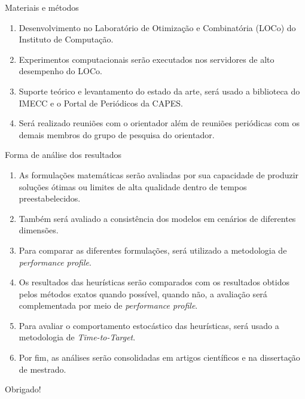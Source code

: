 \documentclass{beamer}
\begin{document}
\begin{frame}{Materiais e métodos}
    
    \begin{enumerate}
        \item Desenvolvimento no Laboratório de Otimização e Combinatória (LOCo) do Instituto de Computação.
        \pause
        \item Experimentos computacionais serão executados nos servidores de alto desempenho do LOCo.
        \pause
        \item Suporte teórico e levantamento do estado da arte, será usado a biblioteca do IMECC e o Portal de Periódicos da CAPES.
        \pause
        \item Será realizado reuniões com o orientador além de reuniões periódicas com os demais membros do grupo de pesquisa do orientador.
    \end{enumerate}

\end{frame}

\begin{frame}{Forma de análise dos resultados}
    
    \begin{enumerate}
        \item As formulações matemáticas serão avaliadas por sua capacidade de produzir soluções ótimas ou limites de alta qualidade dentro de tempos preestabelecidos.
        \pause
        \item Também será avaliado a consistência dos modelos em cenários de diferentes dimensões.
        \pause
        \item Para comparar as diferentes formulações, será utilizado a metodologia de \emph{performance profile}.
        \pause
        \item Os resultados das heurísticas serão comparados com os resultados obtidos pelos métodos exatos quando possível, quando não, a avaliação será complementada por meio de \emph{performance profile}.
        \pause
        \item Para avaliar o comportamento estocástico das heurísticas, será usado a metodologia de \emph{Time-to-Target}.
        \pause
        \item Por fim, as análises serão consolidadas em artigos científicos e na dissertação de mestrado.
    \end{enumerate}

\end{frame}

\begin{frame}
\begin{center}
    Obrigado!
\end{center}
\end{frame}
\end{document}
